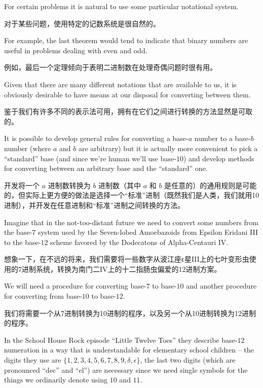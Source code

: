 \vspace{.5 in}

For certain problems it is natural to use some particular notational system.

对于某些问题，使用特定的记数系统是很自然的。

For example, the
last theorem would tend to indicate that binary numbers are useful
in problems dealing with even and odd.

例如，最后一个定理倾向于表明二进制数在处理奇偶问题时很有用。

Given that there are many different 
notations that are available to us, it is obviously desirable to have 
means at our disposal for converting between them.

鉴于我们有许多不同的表示法可用，拥有在它们之间进行转换的方法显然是可取的。

It is possible to 
develop general rules for converting a base-$a$ number to a base-$b$ 
number (where $a$ and $b$ are arbitrary) but it is actually more convenient 
to pick a ``standard'' base (and since we're human we'll use base-$10$) 
and develop methods for converting between an arbitrary base and the 
``standard'' one.

开发将一个 $a$ 进制数转换为 $b$ 进制数（其中 $a$ 和 $b$ 是任意的）的通用规则是可能的，但实际上更方便的做法是选择一个“标准”进制（既然我们是人类，我们就用10进制），并开发在任意进制和“标准”进制之间转换的方法。

Imagine that in the not-too-distant future we need to 
convert some numbers from the base-$7$ system used by the Seven-lobed 
Amoebazoids from Epsilon Eridani III to the base-$12$ scheme favored 
by the Dodecatons of Alpha-Centauri IV.

想象一下，在不远的将来，我们需要将一些数字从波江座ε星III上的七叶变形虫使用的7进制系统，转换为南门二IV上的十二指肠虫偏爱的12进制方案。

We will need a procedure
for converting base-$7$ to base-$10$ and another procedure for converting 
from base-$10$ to base-$12$.

我们将需要一个从7进制转换为10进制的程序，以及另一个从10进制转换为12进制的程序。

In the School House Rock episode 
``Little Twelve Toes'' they describe base-$12$
numeration in a way that is understandable for elementary school 
children -- the digits they use are 
$\{1, 2, 3, 4, 5, 6, 7, 8, 9, \delta, \epsilon \}$, the last two digits 
(which are pronounced ``dec'' and ``el'') are necessary since we need 
single symbols for the things we ordinarily denote using $10$ and $11$.

